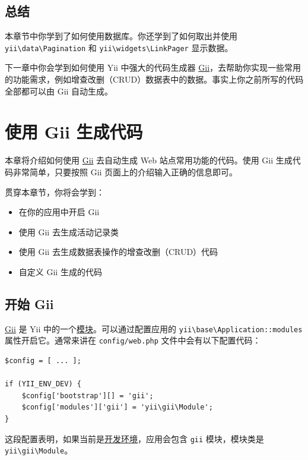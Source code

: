 \subsection{总结 \label{start-databases.md::summary}}
本章节中你学到了如何使用数据库。你还学到了如何取出并使用 \texttt{yii{\allowbreak{}\textbackslash}data{\allowbreak{}\textbackslash}Pagination} 和 \texttt{yii{\allowbreak{}\textbackslash}widgets{\allowbreak{}\textbackslash}LinkPager} 显示数据。

下一章中你会学到如何使用 Yii 中强大的代码生成器 \hyperref[tool-gii.md]{Gii}，去帮助你实现一些常用的功能需求，例如增查改删（CRUD）数据表中的数据。事实上你之前所写的代码全部都可以由 Gii 自动生成。



\label{start-gii.md}\section{使用 Gii 生成代码}
本章将介绍如何使用 \hyperref[tool-gii.md]{Gii} 去自动生成 Web 站点常用功能的代码。使用 Gii 生成代码非常简单，只要按照 Gii 页面上的介绍输入正确的信息即可。

贯穿本章节，你将会学到：

\begin{itemize}
\item 在你的应用中开启 Gii
\item 使用 Gii 去生成活动记录类
\item 使用 Gii 去生成数据表操作的增查改删（CRUD）代码
\item 自定义 Gii 生成的代码
\end{itemize}
\subsection{开始 Gii \label{start-gii.md::starting-gii}}
\hyperref[tool-gii.md]{Gii} 是 Yii 中的一个\hyperref[structure-modules.md]{模块}。可以通过配置应用的 \texttt{yii{\allowbreak{}\textbackslash}base{\allowbreak{}\textbackslash}Application\allowbreak{}::\allowbreak{}modules} 属性开启它。通常来讲在 \lstinline|config/web.php| 文件中会有以下配置代码：

\lstset{language=php}\begin{lstlisting}
$config = [ ... ];

if (YII_ENV_DEV) {
    $config['bootstrap'][] = 'gii';
    $config['modules']['gii'] = 'yii\gii\Module';
}
\end{lstlisting}
这段配置表明，如果当前是\hyperref[concept-configurations.md::environment-constants]{开发环境}，应用会包含 \lstinline|gii| 模块，模块类是 \texttt{yii{\allowbreak{}\textbackslash}gii{\allowbreak{}\textbackslash}Module}。

